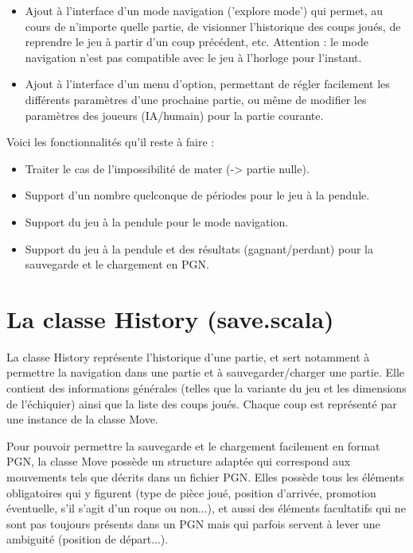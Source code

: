 \documentclass[11pt]{article}
\begin{document}
\begin{itemize}
\item Ajout à l'interface d'un mode navigation ('explore mode') qui permet, au cours de n'importe quelle partie, de visionner l'historique des coups joués, de reprendre le jeu à partir d'un coup précédent, etc. Attention : le mode navigation n'est pas compatible avec le jeu à l'horloge pour l'instant.

\item Ajout à l'interface d'un menu d'option, permettant de régler facilement les différents paramètres d'une prochaine partie, ou même de modifier les paramètres des joueurs (IA/humain) pour la partie courante.
\end{itemize}
\-

Voici les fonctionnalités qu'il reste à faire :\newline
\begin{itemize}
\item Traiter le cas de l'impossibilité de mater (-> partie nulle).
\item Support d'un nombre quelconque de périodes pour le jeu à la pendule.
\item Support du jeu à la pendule pour le mode navigation.
\item Support du jeu à la pendule et des résultats (gagnant/perdant) pour la sauvegarde et le chargement en PGN.
\end{itemize}
\-

\section{La classe History (save.scala)}

La classe History représente l'historique d'une partie, et sert notamment à permettre la navigation dans une partie et à sauvegarder/charger une partie. Elle contient des informations générales (telles que la variante du jeu et les dimensions de l'échiquier) ainsi que la liste des coups joués. Chaque coup est représenté par une instance de la classe Move.

Pour pouvoir permettre la sauvegarde et le chargement facilement en format PGN, la classe Move possède un structure adaptée qui correspond aux mouvements tels que décrits dans un fichier PGN. Elles possède tous les éléments obligatoires qui y figurent (type de pièce joué, position d'arrivée, promotion éventuelle, s'il s'agit d'un roque ou non...), et aussi des éléments facultatifs qui ne sont pas toujours présents dans un PGN mais qui parfois servent à lever une ambiguité (position de départ...).\newline
\end{document}

